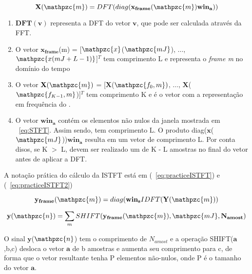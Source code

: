         \begin{equation}\label{eq:practiceSTFT}
            \mathbf{X}(\mathpzc{m})
            = DFT(diag(\mathbf{x_{frame}}(\mathpzc{m})\mathbf{win_a}))
         \end{equation}
    
        \begin{enumerate}
        
            \item $\mathbf{DFT(v)}$ representa a DFT do vetor $\mathbf{v}$, que pode ser calculada através da FFT.
            
            \item O vetor $\mathbf{x_{frame}}$(m) = [$\mathpzc{x}$($\mathpzc{mJ}$), $\dots$, $\mathpzc{x(mJ + L - 1)}$]$^T$ tem comprimento L e representa o \textit{frame m} no domínio do tempo
            
            \item O vetor $\mathbf{X}(\mathpzc{m})$ = [$\mathbf{X}$($\mathpzc{f_0,m})$, $\dots$, $\mathbf{X}$($\mathpzc{f_{K-1},m}$)]$^T$ tem comprimento K e é o vetor com a representação em
            frequência do .
            
            \item O vetor $\mathbf{win_a}$ contém os elementos não nulos da janela mostrada em ~\ref{eq:STFT}. Assim sendo, tem comprimento L. O produto diag($\mathbf{x}$($\mathpzc{mJ}$))$\mathbf{win_a}$ resulta em um vetor de comprimento L. Por conta disos, se K $>$ L, devem ser realizado um  de K - L amostras no final do vetor antes de aplicar a DFT.
        
        \end{enumerate}
        A notação prática do cálculo da ISTFT está em (~\ref{eq:practiceISTFT}) e (~\ref{eq:practiceISTFT2})
        
        \begin{equation}\label{eq:practiceISTFT}
            \mathbf{y_{frame}}(\mathpzc{m})
            = diag(\mathbf{win_s}IDFT(\mathbf{Y}(\mathpzc{m}))
         \end{equation}
        
        \begin{equation}\label{eq:practiceISTFT2}
            \mathbf{y}(\mathpzc{n})
            = \sum_{m}SHIFT(\mathbf{y_{frame}}(\mathpzc{m}),\mathpzc{mJ},\mathbf{N_{amost}})
         \end{equation}
        
        O sinal $\mathbf{y}$($\mathpzc{n}$) tem o comprimento de $N_{amost}$ e a operação SHIFT($\mathbf{a}$,b,c) desloca o vetor $\mathbf{a}$ de b amostras e aumenta seu comprimento para c, de forma que o vetor resultante tenha P elementos não-nulos, onde P é o tamanho do vetor $\mathbf{a}$.
        
